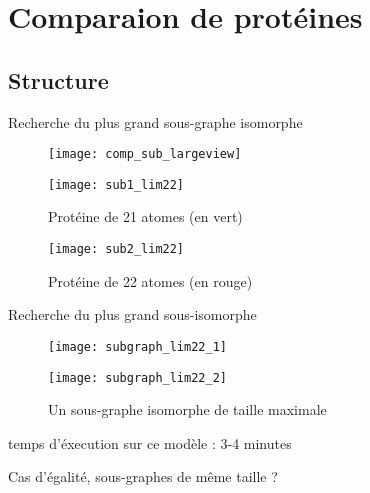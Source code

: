 \section{Comparaion de protéines}

\subsection{Structure}
\begin{frame}{Recherche du plus grand sous-graphe isomorphe}
    \scriptsize
    \begin{figure}[!htb]
    \texttt{[image: comp\_sub\_largeview]}
    \end{figure}
    \begin{multicols}{2}
        \begin{figure}[!htb]
            \centering
            \texttt{[image: sub1\_lim22]}
            \caption{\label{fig: sub1}Protéine de 21 atomes (en vert)}
        \end{figure}
        \begin{figure}[!htb]
            \centering
            \texttt{[image: sub2\_lim22]}
            \caption{\label{fig: sub2}Protéine de 22 atomes (en rouge)}
        \end{figure}
    \end{multicols}
\end{frame}

\begin{frame}{Recherche du plus grand sous-isomorphe}
    \begin{multicols}{2}
        \begin{figure}[!htb]
            \centering
            \texttt{[image: subgraph\_lim22\_1]}
        \end{figure}
        \begin{figure}[!htb]
            \centering
            \texttt{[image: subgraph\_lim22\_2]}
        \end{figure}
    \end{multicols}
    \begin{figure}
        \centering
        \caption{\label{fig:max_isom}Un sous-graphe isomorphe de taille maximale}
    \end{figure} 
    temps d'éxecution sur ce modèle : 3-4 minutes
    \begin{center}
        Cas d'égalité, sous-graphes de même taille ?
    \end{center}
\end{frame}

